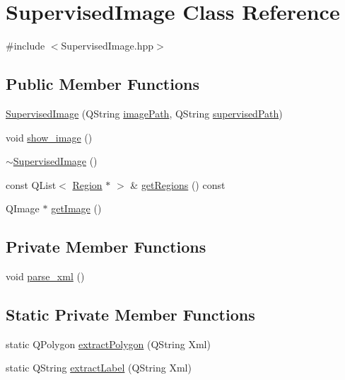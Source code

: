 \hypertarget{class_supervised_image}{\section{Supervised\+Image Class Reference}
\label{class_supervised_image}
}


{\ttfamily \#include $<$Supervised\+Image.\+hpp$>$}

\subsection*{Public Member Functions}
\begin{DoxyCompactItemize}
\item 
\hyperlink{class_supervised_image_a032c9ef022d741cfb65c683ed11029ed}{Supervised\+Image} (Q\+String \hyperlink{class_supervised_image_a39f8b0212d2dae489d7b060b0d8dd1b9}{image\+Path}, Q\+String \hyperlink{class_supervised_image_aeeb634f3804dffba600e6aea71fc353e}{supervised\+Path})
\item 
void \hyperlink{class_supervised_image_aa2ab17f3c0be74a99858965e2cddb298}{show\+\_\+image} ()
\item 
\hyperlink{class_supervised_image_a4e9cb98175c10635ff6b4aedb578d70e}{$\sim$\+Supervised\+Image} ()
\item 
const Q\+List$<$ \hyperlink{class_region}{Region} $\ast$ $>$ \& \hyperlink{class_supervised_image_a1ffbba524b28567da37e849f5bb5dbf7}{get\+Regions} () const 
\item 
Q\+Image $\ast$ \hyperlink{class_supervised_image_aaf7160e7c4a85e4c68f36f62e39b6bfa}{get\+Image} ()
\end{DoxyCompactItemize}
\subsection*{Private Member Functions}
\begin{DoxyCompactItemize}
\item 
void \hyperlink{class_supervised_image_ae351771d19a2bbd53c88e871ed5bb4de}{parse\+\_\+xml} ()
\end{DoxyCompactItemize}
\subsection*{Static Private Member Functions}
\begin{DoxyCompactItemize}
\item 
static Q\+Polygon \hyperlink{class_supervised_image_aaeaaf36c52ed6317d547461d39a57b4e}{extract\+Polygon} (Q\+String Xml)
\item 
static Q\+String \hyperlink{class_supervised_image_af603900bba42552e5d8395a5a265907a}{extract\+Label} (Q\+String Xml)
\end{DoxyCompactItemize}
